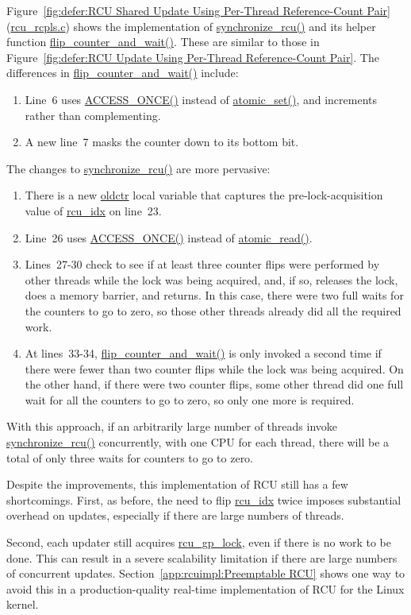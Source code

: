 Figure~\ref{fig:defer:RCU Shared Update Using Per-Thread Reference-Count Pair}
(\url{rcu_rcpls.c})
shows the implementation of \url{synchronize_rcu()} and its helper
function \url{flip_counter_and_wait()}.
These are similar to those in
Figure~\ref{fig:defer:RCU Update Using Per-Thread Reference-Count Pair}.
The differences in \url{flip_counter_and_wait()} include:
\begin{enumerate}
\item	Line~6 uses \url{ACCESS_ONCE()} instead of \url{atomic_set()},
	and increments rather than complementing.
\item	A new line~7 masks the counter down to its bottom bit.
\end{enumerate}

The changes to \url{synchronize_rcu()} are more pervasive:
\begin{enumerate}
\item	There is a new \url{oldctr} local variable that captures
	the pre-lock-acquisition value of \url{rcu_idx} on
	line~23.
\item	Line~26 uses \url{ACCESS_ONCE()} instead of \url{atomic_read()}.
\item	Lines~27-30 check to see if at least three counter flips were
	performed by other threads while the lock was being acquired,
	and, if so, releases the lock, does a memory barrier, and returns.
	In this case, there were two full waits for the counters to
	go to zero, so those other threads already did all the required work.
\item	At lines~33-34, \url{flip_counter_and_wait()} is only
	invoked a second time if there were fewer than two counter flips
	while the lock was being acquired.
	On the other hand, if there were two counter flips, some other
	thread did one full wait for all the counters to go to zero,
	so only one more is required.
\end{enumerate}

With this approach, if an arbitrarily large number of threads invoke
\url{synchronize_rcu()} concurrently, with one CPU for each thread, there
will be a total of only three waits for counters to go to zero.

Despite the improvements, this implementation of RCU still
has a few shortcomings.
First, as before, the need to flip \url{rcu_idx} twice imposes substantial
overhead on updates, especially if there are large
numbers of threads.

Second, each updater still acquires \url{rcu_gp_lock}, even if there
is no work to be done.
This can result in a severe scalability limitation
if there are large numbers of concurrent updates.
Section~\ref{app:rcuimpl:Preemptable RCU} shows
one way to avoid this in a production-quality real-time
implementation of RCU for the Linux kernel.

